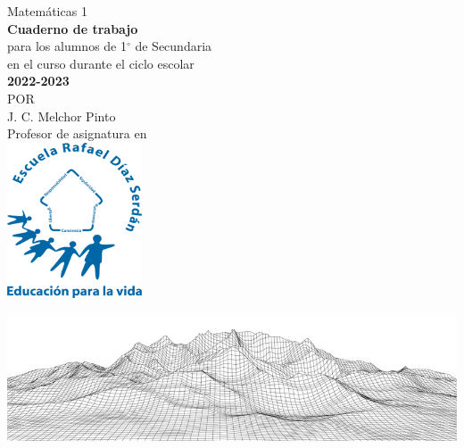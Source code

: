\thispagestyle{empty}
\begin{center}
    \vspace{4cm}
    {\Huge Matem\'aticas 1}\\
    \vspace{1cm}
    \normalsize
    \textbf{\large Cuaderno de trabajo}\\
    para los alumnos de 1$^\circ$ de  Secundaria\\
    en el curso durante el ciclo escolar\\
    \textbf{2022-2023}\\
    \vspace{2cm}
    \small POR\\
    \Large J. C. Melchor Pinto\\[0.5em]
    \normalsize Profesor de asignatura en\\
    \vspace{2cm}
    \includegraphics[width=4cm]{../Images/LOGO_RDS_nobg.png}\\
    \vspace{1.8cm}
\end{center}
\includegraphics[width=1\textwidth]{../Images/cover_bg.png}